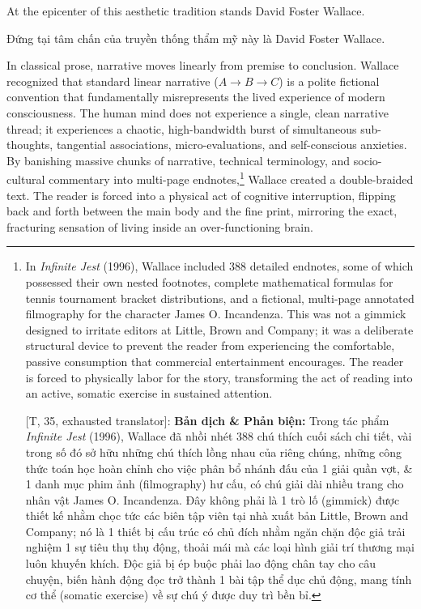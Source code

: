 \documentclass[11pt]{article}
\begin{document}
At the epicenter of this aesthetic tradition stands David Foster Wallace.

Đứng tại tâm chấn của truyền thống thẩm mỹ này là David Foster Wallace.

In classical prose, narrative moves linearly from premise to conclusion. Wallace recognized that standard linear narrative ($A \to B \to C$) is a polite fictional convention that fundamentally misrepresents the lived experience of modern consciousness. The human mind does not experience a single, clean narrative thread; it experiences a chaotic, high-bandwidth burst of simultaneous sub-thoughts, tangential associations, micro-evaluations, and self-conscious anxieties. By banishing massive chunks of narrative, technical terminology, and socio-cultural commentary into multi-page endnotes,\footnote{In \textit{Infinite Jest} (1996), Wallace included 388 detailed endnotes, some of which possessed their own nested footnotes, complete mathematical formulas for tennis tournament bracket distributions, and a fictional, multi-page annotated filmography for the character James O. Incandenza. This was not a gimmick designed to irritate editors at Little, Brown and Company; it was a deliberate structural device to prevent the reader from experiencing the comfortable, passive consumption that commercial entertainment encourages. The reader is forced to physically labor for the story, transforming the act of reading into an active, somatic exercise in sustained attention.
	
	\textsf{[T, 35, exhausted translator]:} \textbf{Bản dịch \& Phản biện:} Trong tác phẩm \textit{Infinite Jest} (1996), Wallace đã nhồi nhét 388 chú thích cuối sách chi tiết, vài trong số đó sở hữu những chú thích lồng nhau của riêng chúng, những công thức toán học hoàn chỉnh cho việc phân bổ nhánh đấu của 1 giải quần vợt, \& 1 danh mục phim ảnh (filmography) hư cấu, có chú giải dài nhiều trang cho nhân vật James O. Incandenza. Đây không phải là 1 trò lố (gimmick) được thiết kế nhằm chọc tức các biên tập viên tại nhà xuất bản Little, Brown and Company; nó là 1 thiết bị cấu trúc có chủ đích nhằm ngăn chặn độc giả trải nghiệm 1 sự tiêu thụ thụ động, thoải mái mà các loại hình giải trí thương mại luôn khuyến khích. Độc giả bị ép buộc phải lao động chân tay cho câu chuyện, biến hành động đọc trở thành 1 bài tập thể dục chủ động, mang tính cơ thể (somatic exercise) về sự chú ý được duy trì bền bỉ.} Wallace created a double-braided text. The reader is forced into a physical act of cognitive interruption, flipping back and forth between the main body and the fine print, mirroring the exact, fracturing sensation of living inside an over-functioning brain.
\end{document}
